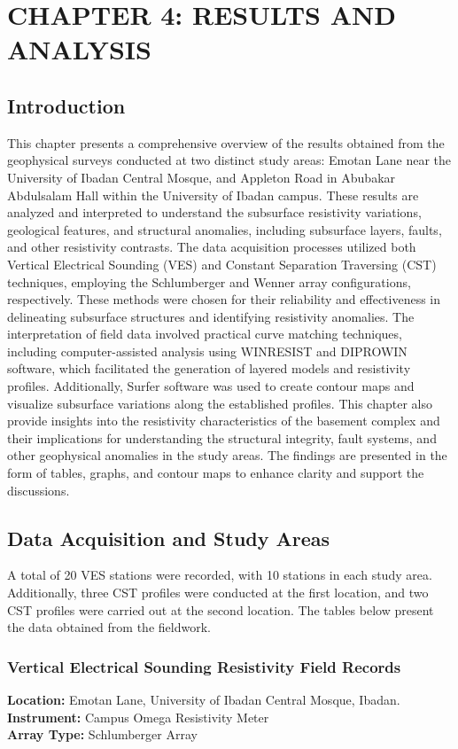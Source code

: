 \documentclass[12pt,a4paper]{report}
\begin{document}
\chapter{CHAPTER 4: RESULTS AND ANALYSIS}

\section{Introduction}
\justifying
This chapter presents a comprehensive overview of the results obtained from the geophysical surveys conducted at two distinct study areas: Emotan Lane near the University of Ibadan Central Mosque, and Appleton Road in Abubakar Abdulsalam Hall within the University of Ibadan campus. These results are analyzed and interpreted to understand the subsurface resistivity variations, geological features, and structural anomalies, including subsurface layers, faults, and other resistivity contrasts. The data acquisition processes utilized both Vertical Electrical Sounding (VES) and Constant Separation Traversing (CST) techniques, employing the Schlumberger and Wenner array configurations, respectively. These methods were chosen for their reliability and effectiveness in delineating subsurface structures and identifying resistivity anomalies. The interpretation of field data involved practical curve matching techniques, including computer-assisted analysis using WINRESIST and DIPROWIN software, which facilitated the generation of layered models and resistivity profiles. Additionally, Surfer software was used to create contour maps and visualize subsurface variations along the established profiles. This chapter also provide insights into the resistivity characteristics of the basement complex and their implications for understanding the structural integrity, fault systems, and other geophysical anomalies in the study areas. The findings are presented in the form of tables, graphs, and contour maps to enhance clarity and support the discussions.

\section{Data Acquisition and Study Areas}
A total of 20 VES stations were recorded, with 10 stations in each study area. Additionally, three CST profiles were conducted at the first location, and two CST profiles were carried out at the second location. The tables below present the data obtained from the fieldwork.

\subsection{Vertical Electrical Sounding Resistivity Field Records}
\textbf{Location:} {Emotan Lane, University of Ibadan Central Mosque, Ibadan.} \\
\textbf{Instrument:} {Campus Omega Resistivity Meter} \\
\textbf{Array Type:} {Schlumberger Array }
\end{document}
